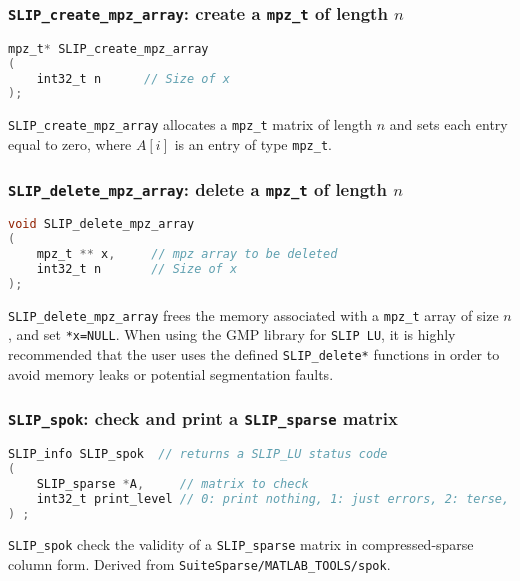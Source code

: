 \documentclass[11pt]{article}
\theoremstyle{definition}
\begin{document}
\cprotect\subsubsection{\verb|SLIP_create_mpz_array|: create a \verb|mpz_t| of length $n$} \label{ss:create_mpz_array}


\begin{lstlisting}[language=C,frame=single]
mpz_t* SLIP_create_mpz_array
(
    int32_t n      // Size of x
);

\end{lstlisting}

\verb|SLIP_create_mpz_array| allocates a \verb|mpz_t| matrix of length $n$ and sets each entry equal to zero, where  $A[i]$ is an entry of type \verb|mpz_t|.

\cprotect\subsubsection{\verb|SLIP_delete_mpz_array|: delete a \verb|mpz_t| of length $n$}


\begin{lstlisting}[language=C,frame=single]
void SLIP_delete_mpz_array
(
    mpz_t ** x,     // mpz array to be deleted
    int32_t n       // Size of x
);
\end{lstlisting}

\verb|SLIP_delete_mpz_array| frees the memory associated with a \verb|mpz_t| array of size $n$, and set \verb|*x=NULL|. When using the GMP library for \verb|SLIP LU|, it is highly recommended that the user uses the defined \verb|SLIP_delete*| functions in order to avoid memory leaks or potential segmentation faults.


\cprotect\subsubsection{\verb|SLIP_spok|: check and print a \verb|SLIP_sparse| matrix}

\begin{lstlisting}[language=C,frame=single]
SLIP_info SLIP_spok  // returns a SLIP_LU status code
(
    SLIP_sparse *A,     // matrix to check
    int32_t print_level // 0: print nothing, 1: just errors, 2: terse, 3: all
) ;
\end{lstlisting}

\verb|SLIP_spok| check the validity of a \verb|SLIP_sparse| matrix in compressed-sparse column form.  Derived from \verb|SuiteSparse/MATLAB_TOOLS/spok|.
\end{document}

